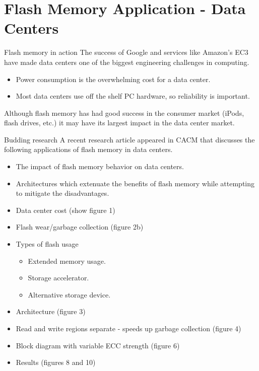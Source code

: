 \section{Flash Memory Application - Data Centers}

\begin{frame}{Flash memory in action}
  The success of Google and services like Amazon's EC3 have made data centers one of the biggest engineering challenges in computing.
  \begin{itemize}
    \item Power consumption is the overwhelming cost for a data center.
    \item Most data centers use off the shelf PC hardware, so reliability is important.
  \end{itemize}
  Although flash memory has had good success in the consumer market (iPods, flash drives, etc.) it may have its largest impact in the data center market.
\end{frame}

\begin{frame}{Budding research}
  A recent research article appeared in CACM that discusses the following applications of flash memory in data centers.
  \begin{itemize}
    \item The impact of flash memory behavior on data centers.
    \item Architectures which extenuate the benefits of flash memory while attempting to mitigate the disadvantages.
  \end{itemize}
\end{frame}

\begin{itemize}
  \item Data center cost (show figure 1)
  \item Flash wear/garbage collection (figure 2b)
  \item Types of flash usage
    \begin{itemize}
      \item Extended memory usage.
      \item Storage accelerator.
      \item Alternative storage device.
    \end{itemize}
  \item Architecture (figure 3)
  \item Read and write regions separate - speeds up garbage collection (figure 4)
  \item Block diagram with variable ECC strength (figure 6)
  \item Results (figures 8 and 10)
\end{itemize}


